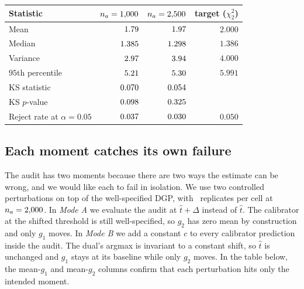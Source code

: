 \documentclass[11pt]{article}
\begin{document}
\begin{table}[H]
\centering
\setlength{\tabcolsep}{8pt}
\begin{tabular}{lrrr}
\toprule
Statistic & $n_a = 1{,}000$ & $n_a = 2{,}500$ & target ($\chi^2_2$) \\
\midrule
Mean                                  & $1.79$         & $1.97$         & $2.000$ \\
Median                                & $1.385$       & $1.298$       & $1.386$ \\
Variance                              & $2.97$          & $3.94$          & $4.000$ \\
$95$th percentile                     & $5.21$  & $5.30$  & $5.991$ \\
KS statistic                          & $0.070$           & $0.054$           & \\
KS $p$-value                          & $0.098$          & $0.325$          & \\
Reject rate at $\alpha = 0.05$         & $0.037$       & $0.030$       & $0.050$ \\
\bottomrule
\end{tabular}
\end{table}

\subsection{Each moment catches its own failure}
\label{app:moment-isolation}

The audit has two moments because there are two ways the estimate can be wrong, and we would like each to fail in isolation. We use two controlled perturbations on top of the well-specified DGP, with \modeNumReps\ replicates per cell at $n_a = 2{,}000$. In \emph{Mode A} we evaluate the audit at $\hat t + \Delta$ instead of $\hat t$. The calibrator at the shifted threshold is still well-specified, so $g_2$ has zero mean by construction and only $g_1$ moves. In \emph{Mode B} we add a constant $c$ to every calibrator prediction inside the audit. The dual's argmax is invariant to a constant shift, so $\hat t$ is unchanged and $g_1$ stays at its baseline while only $g_2$ moves. In the table below, the mean-$g_1$ and mean-$g_2$ columns confirm that each perturbation hits only the intended moment.
\end{document}
